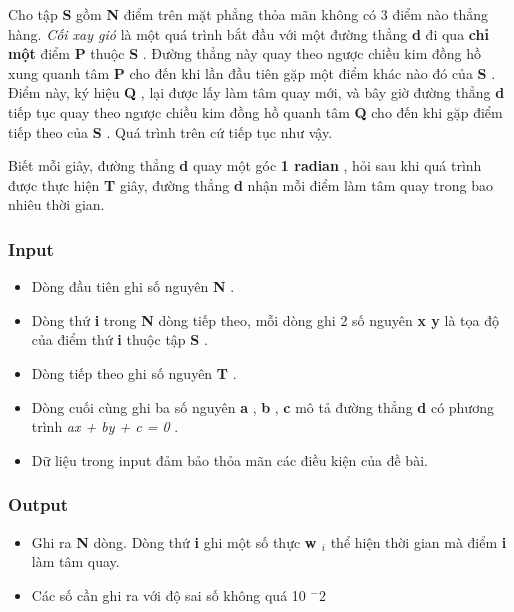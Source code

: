 



   Cho tập   \textbf{    S   }   gồm   \textbf{    N   }   điểm trên mặt phẳng thỏa mãn không có 3 điểm nào thẳng hàng.   \emph{    Cối xay gió   }   là một quá trình bắt đầu với một đường thẳng   \textbf{    d   }   đi qua   \textbf{    chỉ một   }   điểm   \textbf{    P   }   thuộc   \textbf{    S   }   . Đường thẳng này quay theo ngược chiều kim đồng hồ xung quanh tâm   \textbf{    P   }   cho đến khi lần đầu tiên gặp một điểm khác nào đó của   \textbf{    S   }   . Điểm này, ký hiệu   \textbf{    Q   }   , lại được lấy làm tâm quay mới, và bây giờ đường thẳng   \textbf{    d   }   tiếp tục quay theo ngược chiều kim đồng hồ quanh tâm   \textbf{    Q   }   cho đến khi gặp điểm tiếp theo của   \textbf{    S   }   . Quá trình trên cứ tiếp tục như vậy.  

   Biết mỗi giây, đường thẳng   \textbf{    d   }   quay một góc   \textbf{    1 radian   }   , hỏi sau khi quá trình được thực hiện   \textbf{    T   }   giây, đường thẳng   \textbf{    d   }   nhận mỗi điểm làm tâm quay trong bao nhiêu thời gian.  

\subsubsection{   Input  }
\begin{itemize}
	\item     Dòng đầu tiên ghi số nguyên    \textbf{     N    }    .   
	\item     Dòng thứ    \textbf{     i    }    trong    \textbf{     N    }    dòng tiếp theo, mỗi dòng ghi 2 số nguyên    \textbf{     x y    }    là tọa độ của điểm thứ    \textbf{     i    }    thuộc tập    \textbf{     S    }    .   
	\item     Dòng tiếp theo ghi số nguyên    \textbf{     T    }    .   
	\item     Dòng cuối cùng ghi ba số nguyên    \textbf{     a    }    ,    \textbf{     b    }    ,    \textbf{     c    }    mô tả đường thẳng    \textbf{     d    }    có phương trình    \emph{     ax + by + c = 0    }    .   
	\item     Dữ liệu trong input đảm bảo thỏa mãn các điều kiện của đề bài.   
\end{itemize}

\subsubsection{   Output  }
\begin{itemize}
	\item     Ghi ra    \textbf{     N    }    dòng. Dòng thứ    \textbf{     i    }    ghi một số thực    \textbf{     w     $_      i     $}    thể hiện thời gian mà điểm    \textbf{     i    }    làm tâm quay.   
	\item     Các số cần ghi ra với độ sai số không quá 10    $^     -2    $
\end{itemize}

